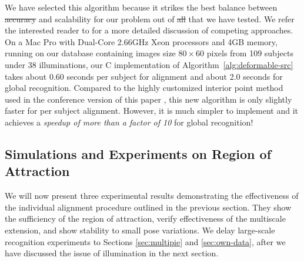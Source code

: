 \documentclass[12pt,journal,draftcls,letterpaper,onecolumn]{IEEEtran}
\providecommand{\DIFadd}[1]{{\protect\color{blue}\uwave{#1}}} %
\providecommand{\DIFdel}[1]{{\protect\color{red}\sout{#1}}}                      %
\providecommand{\DIFaddbegin}{} %
\providecommand{\DIFaddend}{} %
\providecommand{\DIFdelbegin}{} %
\providecommand{\DIFdelend}{} %
\begin{document}
%

We have selected this algorithm because it strikes the best
balance between \DIFdelbegin \DIFdel{accuracy }\DIFdelend \DIFaddbegin \DIFadd{speed, accuracy, }\DIFaddend and scalability for our problem out of
\DIFdelbegin \DIFdel{all }\DIFdelend \DIFaddbegin \DIFadd{many algorithms }\DIFaddend that we have tested. We refer the interested reader to
\cite{YangA2010-pp} for a more detailed discussion of competing
approaches.  On a Mac Pro with
Dual-Core 2.66GHz Xeon processors and 4GB memory, 
running on our database containing images size $80\times 60$ 
pixels from 109 subjects under 38 illuminations,
our C implementation of Algorithm~\ref{alg:deformable-src} takes
about 0.60 seconds per subject for alignment and about 2.0
seconds for global recognition. Compared to the highly
customized interior point method used in the conference version
of this paper \cite{Wagner2009-CVPR}, this new algorithm is 
only slightly faster for per subject alignment. However, it is
much simpler to implement and it achieves a
\emph{speedup of more than a factor of 10} for global
recognition!

\subsection{Simulations and Experiments on Region of
Attraction} We will now present three experimental results
demonstrating the effectiveness of the individual alignment
procedure outlined in the previous section. They show the sufficiency of the
region of attraction, verify effectiveness of the multiscale extension,
and show stability to small pose variations.  We delay large-scale recognition experiments
to Sections \ref{sec:multipie} and \ref{sec:own-data}, after we
have discussed the issue of illumination in the next section.
\DIFdelbegin %
\DIFdelend 
\end{document}
